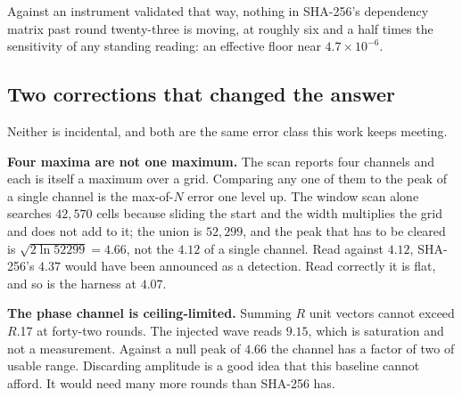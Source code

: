 Against an instrument validated that way, nothing in SHA-256's dependency matrix past round
twenty-three is moving, at roughly six and a half times the sensitivity of any standing reading:
an effective floor near \(4.7 \times 10^{-6}\).

\subsection{Two corrections that changed the answer}

Neither is incidental, and both are the same error class this work keeps meeting.

\textbf{Four maxima are not one maximum.} The scan reports four channels and each is itself a
maximum over a grid. Comparing any one of them to the peak of a single channel is the max-of-\(N\)
error one level up. The window scan alone searches \(42{,}570\) cells because sliding the start and
the width multiplies the grid and does not add to it; the union is \(52{,}299\), and the peak
that has to be cleared is \(\sqrt{2 \ln 52299} = 4.66\), not the \(4.12\) of a single channel.
Read against \(4.12\), SHA-256's \(4.37\) would have been announced as a detection. Read correctly
it is flat, and so is the harness at \(4.07\).

\textbf{The phase channel is ceiling-limited.} Summing \(R\) unit vectors cannot exceed \(R\).17\) at forty-two
rounds. The injected wave reads \(9.15\), which is saturation and not a measurement. Against a
null peak of \(4.66\) the channel has a factor of two of usable range. Discarding amplitude is a
good idea that this baseline cannot afford. It would need many more rounds than SHA-256 has.

